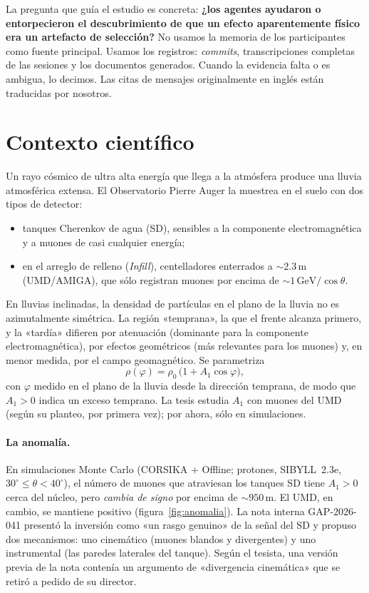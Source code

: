 \documentclass[11pt,a4paper]{article}
\begin{document}
La pregunta que guía el estudio es concreta: \textbf{¿los agentes ayudaron o entorpecieron el
descubrimiento de que un efecto aparentemente físico era un artefacto de selección?} No usamos la memoria
de los participantes como fuente principal. Usamos los registros: \emph{commits}, transcripciones completas
de las sesiones y los documentos generados. Cuando la evidencia falta o es ambigua, lo decimos. Las citas
de mensajes originalmente en inglés están traducidas por nosotros.

\section{Contexto científico}
Un rayo cósmico de ultra alta energía que llega a la atmósfera produce una lluvia atmosférica extensa. El
Observatorio Pierre Auger la muestrea en el suelo con dos tipos de detector:
\begin{itemize}
  \item tanques Cherenkov de agua (SD), sensibles a la componente electromagnética y a muones de casi
  cualquier energía;
  \item en el arreglo de relleno (\emph{Infill}), centelladores enterrados a $\sim 2.3$\,m (UMD/AMIGA), que
  sólo registran muones por encima de $\sim 1\,\mathrm{GeV}/\cos\theta$.
\end{itemize}

En lluvias inclinadas, la densidad de partículas en el plano de la lluvia no es azimutalmente simétrica. La
región «temprana», la que el frente alcanza primero, y la «tardía» difieren por atenuación (dominante para
la componente electromagnética), por efectos geométricos (más relevantes para los muones) y, en menor
medida, por el campo geomagnético. Se parametriza
\begin{equation}
  \rho(\varphi) = \rho_0\,\bigl(1 + A_1\cos\varphi\bigr),
\end{equation}
con $\varphi$ medido en el plano de la lluvia desde la dirección temprana, de modo que $A_1>0$ indica un
exceso temprano. La tesis estudia $A_1$ con muones del UMD (según su planteo, por primera vez); por ahora,
sólo en simulaciones.

\paragraph{La anomalía.} En simulaciones Monte Carlo (CORSIKA + Offline; protones, SIBYLL~2.3e,
$30^\circ\!\le\theta<40^\circ$), el número de muones que atraviesan los tanques SD tiene $A_1>0$ cerca del
núcleo, pero \emph{cambia de signo} por encima de $\sim 950$\,m. El UMD, en cambio, se mantiene positivo
(figura~\ref{fig:anomalia}). La nota interna GAP-2026-041 \cite{gap041} presentó la inversión como «un
rasgo genuino» de la señal del SD y propuso dos mecanismos: uno cinemático (muones blandos y divergentes)
y uno instrumental (las paredes laterales del tanque). Según el tesista, una versión previa de la nota
contenía un argumento de «divergencia cinemática» que se retiró a pedido de su director.
\end{document}
